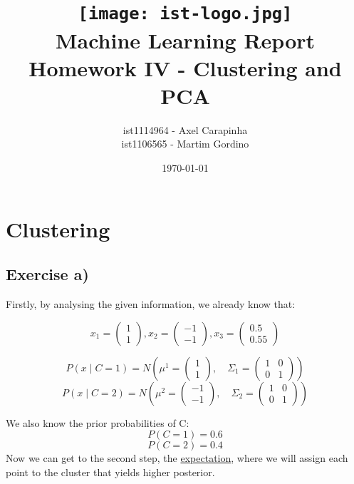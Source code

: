 \documentclass{article}
\title{
\texttt{[image: ist-logo.jpg]}\\[1ex] %
Machine Learning Report \\ 
\large Homework IV - Clustering and PCA
}
\author{ist1114964 - Axel Carapinha \\ ist1106565 - Martim Gordino}
\date{\today}
\begin{document}
\maketitle
\tableofcontents
\newpage

\section{Clustering}
\subsection{Exercise a)}

Firstly, by analysing the given information, we already know that:

\[
x_1 = \begin{pmatrix} 1 \\ 1 \end{pmatrix} , x_2 = \begin{pmatrix} -1 \\ -1 \end{pmatrix} , x_3 = \begin{pmatrix} 0.5 \\ 0.55 \end{pmatrix}
\]

\[
P(x \mid C = 1) = N\left(\mu^1 = \begin{pmatrix} 1 \\ 1 \end{pmatrix}, \quad \Sigma_1 = \begin{pmatrix} 1 & 0 \\ 0 & 1 \end{pmatrix}\right)
\]
\[
P(x \mid C = 2) = N\left(\mu^2 = \begin{pmatrix} -1 \\ -1 \end{pmatrix}, \quad \Sigma_2 = \begin{pmatrix} 1 & 0 \\ 0 & 1 \end{pmatrix}\right)
\]

We also know the prior probabilities of C:
\[
P(C = 1) = 0.6
\]
\[
P(C = 2) = 0.4
\]
\newline
Now we can get to the second step, the \underline{expectation},
where we will assign each point to the cluster that yields higher posterior.
\end{document}
